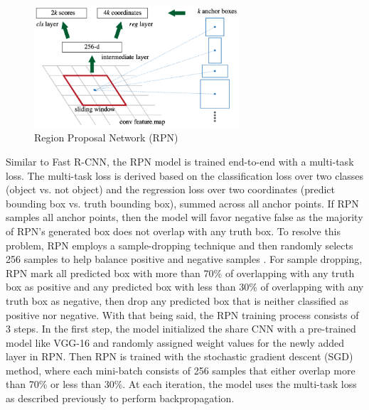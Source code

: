 \begin{figure}[!ht]
    \centering
    \includegraphics[width=3in]{figures/rpn_anchor.png}
    \caption{Region Proposal Network (RPN) \cite{faster_rcnn_2015}} \label{fig:faster_rcnn_anchor}
\end{figure}

Similar to Fast R-CNN, the RPN model is trained end-to-end with a multi-task loss. The multi-task loss is derived based on the classification loss over two classes (object vs. not object) and the regression loss over two coordinates (predict bounding box vs. truth bounding box), summed across all anchor points. If RPN samples all anchor points, then the model will favor negative false as the majority of RPN's generated box does not overlap with any truth box. To resolve this problem, RPN employs a sample-dropping technique and then randomly selects 256 samples to help balance positive and negative samples \cite{faster_rcnn_2015}. For sample dropping, RPN mark all predicted box with more than 70\% of overlapping with any truth box as positive and any predicted box with less than 30\% of overlapping with any truth box as negative, then drop any predicted box that is neither classified as positive nor negative. With that being said, the RPN training process consists of 3 steps. In the first step, the model initialized the share CNN with a pre-trained model like VGG-16 and randomly assigned weight values for the newly added layer in RPN. Then RPN is trained with the stochastic gradient descent (SGD) method, where each mini-batch consists of 256 samples that either overlap more than 70\% or less than 30\%. At each iteration, the model uses the multi-task loss as described previously to perform backpropagation.

